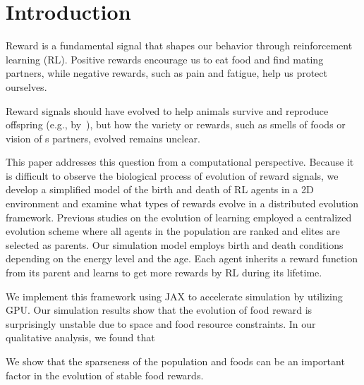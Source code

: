 \section{Introduction}\label{sec:intro}
Reward is a fundamental signal that shapes our behavior through reinforcement learning (RL). Positive rewards encourage us to eat food and find mating partners, while negative rewards, such as pain and fatigue, help us protect ourselves.

Reward signals should have evolved to help animals survive and reproduce offspring (e.g., by~\cite{schultzNeuronalRewardDecision2015}), but how the variety or rewards, such as smells of foods or vision of s partners, evolved remains unclear.

This paper addresses this question from a computational perspective. Because it is difficult to observe the biological process of evolution of reward signals, we develop a simplified model of the birth and death of RL agents in a 2D environment and examine what types of rewards evolve in a
distributed evolution framework.
Previous studies on the evolution of learning \citep{hintonHowLearningCan1987,singhWhereRewardsCome2009} employed a centralized evolution scheme where all agents in the population are ranked and elites are selected as parents.
Our simulation model employs birth and death conditions depending on the energy level and the age. Each agent inherits a reward function from its parent and learns to get more rewards by RL during its lifetime. %

We implement this framework using JAX\citep{jax2018github} to accelerate simulation by utilizing GPU. Our simulation results show that the evolution of food reward is surprisingly unstable due to space and food resource constraints. In our qualitative analysis, we found that

We show that the sparseness of the population and foods can be an important factor in the evolution of stable food rewards.

